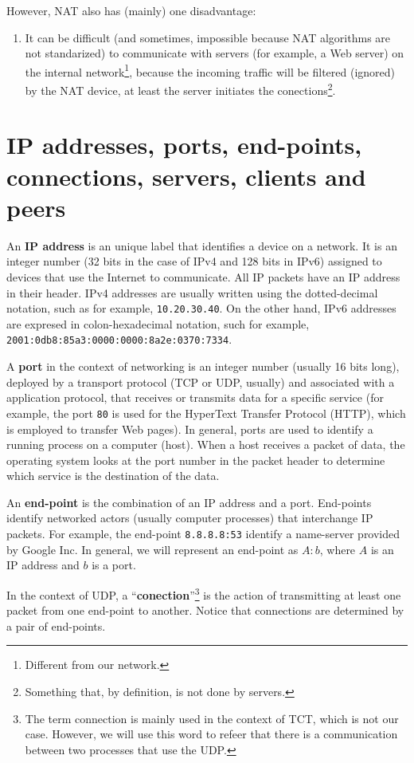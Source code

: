 However, NAT also has (mainly) one disadvantage:
\begin{enumerate}
\item It can be difficult (and sometimes, impossible because NAT
  algorithms are not standarized) to communicate with servers (for
  example, a Web server) on the internal network\footnote{Different
    from our network.}, because the incoming traffic will be filtered
  (ignored) by the NAT device, at least the server initiates the
  conections\footnote{Something that, by definition, is not done by
    servers.}.
\end{enumerate}

\section{IP addresses, ports, end-points, connections, servers, clients and peers}

An \textbf{IP address} is an unique label that identifies a device on a
network. It is an integer number (32 bits in the case of IPv4 and 128
bits in IPv6) assigned to devices that use the Internet to
communicate. All IP packets have an IP address in their header. IPv4
addresses are usually written using the dotted-decimal notation, such
as for example, \texttt{10.20.30.40}. On the other hand, IPv6
addresses are expresed in colon-hexadecimal notation, such for
example, \texttt{2001:0db8:85a3:0000:0000:8a2e:0370:7334}.

A \textbf{port} in the context of networking is an integer number
(usually 16 bits long), deployed by a transport protocol (TCP or UDP,
usually) and associated with a application protocol, that receives or
transmits data for a specific service (for example, the port
\texttt{80} is used for the HyperText Transfer Protocol (HTTP), which
is employed to transfer Web pages). In general, ports are used to
identify a running process on a computer (host). When a host receives
a packet of data, the operating system looks at the port number in the
packet header to determine which service is the destination of the
data.

An \textbf{end-point} is the combination of an IP address and a
port. End-points identify networked actors (usually computer
processes) that interchange IP packets. For example, the end-point
\texttt{8.8.8.8:53} identify a name-server provided by Google Inc. In
general, we will represent an end-point as $A:b$, where $A$ is an
IP address and $b$ is a port.

In the context of UDP, a ``\textbf{conection}''\footnote{The term
  connection is mainly used in the context of TCT, which is not our
  case. However, we will use this word to refeer that there is a
  communication between two processes that use the UDP.} is the action
of transmitting at least one packet from one end-point to
another. Notice that connections are determined by a pair of
end-points.

